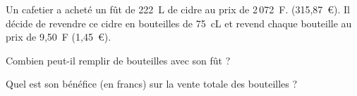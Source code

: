 Un cafetier a acheté un fût de 222~L de cidre au prix de 2\,072~F. (315,87~\textgreek{\euro}). Il décide de revendre ce cidre en bouteilles de 75~cL et revend chaque bouteille au prix de 9,50~F (1,45~\textgreek{\euro}).
\begin{myenumerate}
\item Combien peut-il remplir de bouteilles avec son fût ?
\item Quel est son bénéfice (en francs) sur la vente totale des bouteilles ?
\end{myenumerate}